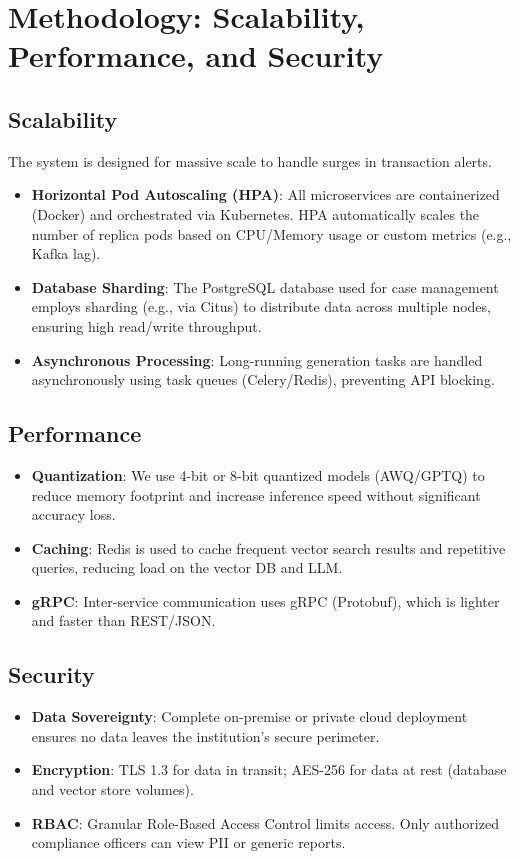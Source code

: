 \documentclass{article}
\begin{document}
\section{Methodology: Scalability, Performance, and Security}
\subsection{Scalability}
The system is designed for massive scale to handle surges in transaction alerts.
\begin{itemize}
    \item \textbf{Horizontal Pod Autoscaling (HPA)}: All microservices are containerized (Docker) and orchestrated via Kubernetes. HPA automatically scales the number of replica pods based on CPU/Memory usage or custom metrics (e.g., Kafka lag).
    \item \textbf{Database Sharding}: The PostgreSQL database used for case management employs sharding (e.g., via Citus) to distribute data across multiple nodes, ensuring high read/write throughput.
    \item \textbf{Asynchronous Processing}: Long-running generation tasks are handled asynchronously using task queues (Celery/Redis), preventing API blocking.
\end{itemize}

\subsection{Performance}
\begin{itemize}
    \item \textbf{Quantization}: We use 4-bit or 8-bit quantized models (AWQ/GPTQ) to reduce memory footprint and increase inference speed without significant accuracy loss.
    \item \textbf{Caching}: Redis is used to cache frequent vector search results and repetitive queries, reducing load on the vector DB and LLM.
    \item \textbf{gRPC}: Inter-service communication uses gRPC (Protobuf), which is lighter and faster than REST/JSON.
\end{itemize}

\subsection{Security}
\begin{itemize}
    \item \textbf{Data Sovereignty}: Complete on-premise or private cloud deployment ensures no data leaves the institution's secure perimeter.
    \item \textbf{Encryption}: TLS 1.3 for data in transit; AES-256 for data at rest (database and vector store volumes).
    \item \textbf{RBAC}: Granular Role-Based Access Control limits access. Only authorized compliance officers can view PII or generic reports.
\end{itemize}
\end{document}
